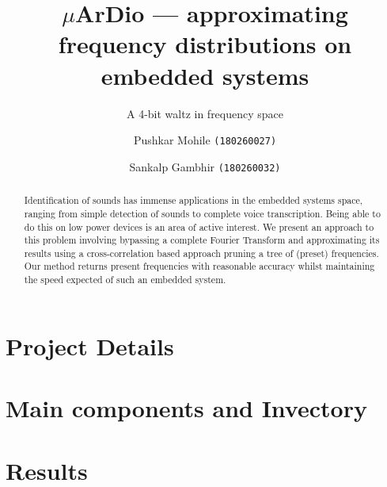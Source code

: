 \documentclass{llncs}
\title{$\mu$ArDio --- approximating frequency distributions on embedded systems}
\subtitle{A 4-bit waltz in frequency space}
\author{Pushkar Mohile \texttt{(180260027)} \and Sankalp Gambhir \texttt{(180260032)}}
\institute{Indian Institute of Technology, Bombay}
\begin{document}
    \maketitle

    \begin{abstract}
    Identification of sounds has immense applications in the embedded systems
    space, ranging from simple detection of sounds to complete voice
    transcription. Being able to do this on low power devices is an area of
    active interest. We present an approach to this problem involving bypassing
    a complete Fourier Transform and approximating its results using a
    cross-correlation based approach pruning a tree of (preset) frequencies. Our
    method returns present frequencies with reasonable accuracy whilst
    maintaining the speed expected of such an embedded system.
    \end{abstract}

    \section{Project Details}
        

    \section{Main components and Invectory}
        

    \section{Results}
        

    \newpage
        

    
    
\end{document}
